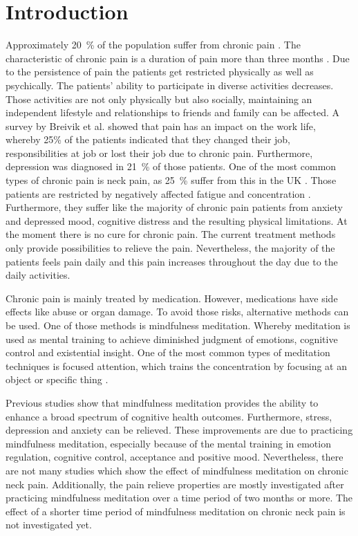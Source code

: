 \section{Introduction}
Approximately 20~\% of the population suffer from chronic pain \cite{Macfarlanea2016}. The characteristic of chronic pain is a duration of pain more than three months \cite{Mello2016}. Due to the persistence of pain the patients get restricted physically as well as psychically. The patients’ ability to participate in diverse activities decreases. Those activities are not only physically but also socially, maintaining an independent lifestyle and relationships to friends and family can be affected. A survey by Breivik et al. \cite{Breivik2006} showed that pain has an impact on the work life, whereby 25\% of the patients indicated that they changed their job, responsibilities at job or lost their job due to chronic pain. Furthermore, depression was diagnosed in 21~\% of those patients. \cite{Breivik2006} One of the most common types of chronic pain is neck pain, as 25~\% suffer from this in the UK \cite{Macfarlanea2016}. Those patients are restricted by negatively affected fatigue and concentration \cite{vanRanderaat2016}. Furthermore, they suffer like the majority of chronic pain patients from anxiety and depressed mood, cognitive distress and the resulting physical limitations. \cite{Gross2013} At the moment there is no cure for chronic pain. The current treatment methods only provide possibilities to relieve the pain. \cite{Pope2017,marcus2009} Nevertheless, the majority of the patients feels pain daily and this pain increases throughout the day due to the daily activities. \cite{Breivik2006} 


Chronic pain is mainly treated by medication. However, medications have side effects like abuse or organ damage. To avoid those risks, alternative methods can be used. One of those methods is mindfulness meditation. Whereby meditation is used as mental training to achieve diminished judgment of emotions, cognitive control and existential insight. \cite{marcus2009} One of the most common types of meditation techniques is focused attention, which trains the concentration by focusing at an object or specific thing \cite{Ziedan2016}. 

Previous studies show that mindfulness meditation provides the ability to enhance a broad spectrum of cognitive health outcomes. Furthermore, stress, depression and anxiety can be relieved. These improvements are due to practicing mindfulness meditation, especially because of the mental training in emotion regulation, cognitive control, acceptance and positive mood. \cite{marcus2009,Zeidan2012}Nevertheless, there are not many studies which show the effect of mindfulness meditation on chronic neck pain. \cite{Macfarlanea2016} Additionally, the pain relieve properties are mostly investigated after practicing mindfulness meditation over a time period of two months or more. The effect of a shorter time period of mindfulness meditation on chronic neck pain is not investigated yet. 


